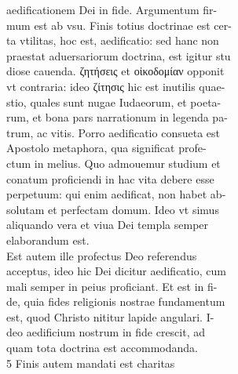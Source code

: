 \documentclass{article}
\begin{document}
\begin{pages}
                aedificationem Dei in fide. Argumentum fir- \\
                mum est ab vsu. Finis totius doctrinae est cer- \\
                ta vtilitas, hoc est, aedificatio: sed hanc non \\
                praestat aduersariorum doctrina, est igitur stu \\
                diose cauenda. ζητήσεις et οἰκοδομίαν opponit \\
                vt contraria: ideo ζίτησις hic est inutilis quae- \\
                stio, quales sunt nugae Iudaeorum, et poeta- \\
                rum, et bona pars narrationum in legenda pa- \\
                trum, ac vitis. Porro aedificatio consueta est \\
                Apostolo metaphora, qua significat profe- \\
                ctum in melius. Quo admouemur studium et \\
                conatum proficiendi in hac vita debere esse \\
                perpetuum: qui enim aedificat, non habet ab- \\
                solutam et perfectam domum. Ideo vt simus \\
                aliquando vera et viua Dei templa semper \\
                elaborandum est. \\
                Est autem ille profectus Deo referendus \\
                acceptus, ideo hic Dei dicitur aedificatio, cum \\
                mali semper in peius proficiant. Et est in fi- \\
                de, quia fides religionis nostrae fundamentum \\
                est, quod Christo nititur lapide angulari. I- \\
                deo aedificium nostrum in fide crescit, ad \\
                quam tota doctrina est accommodanda. \\
                5 Finis autem mandati est charitas \\

\end{pages}
\end{document}
